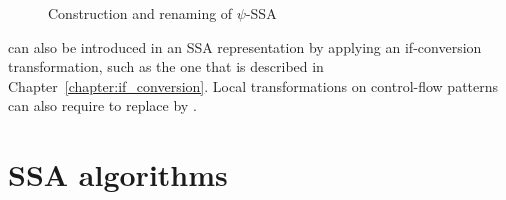 \begin{figure}[h]
\footnotesize
{}\hfill
{} \hfill
{} \hfill
{}
\caption{Construction and renaming of $\psi$-SSA}
\label{fig:psi_ssa_construct}
\end{figure}


\psifuns can also be introduced in an SSA representation by
applying an if-conversion transformation, such as the one that is
described in Chapter~\ref{chapter:if_conversion}. Local transformations
on control-flow patterns can also require to replace \phifuns
by \psifuns.

\section{SSA algorithms}



